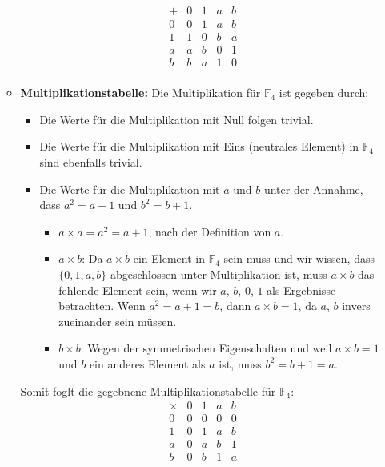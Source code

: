 \documentclass[a4paper]{scrartcl}
\begin{document}
\begin{enumerate}[label=\alph*)]
\begin{itemize}
\[\begin{array}{c|cccc}
    + & 0 & 1 & a & b \\
    \hline
    0 & 0 & 1 & a & b \\
    1 & 1 & 0 & b & a \\
    a & a & b & 0 & 1 \\
    b & b & a & 1 & 0 \\
    \end{array}
    \]
  \item \textbf{Multiplikationstabelle:} Die Multiplikation für $\mathbb{F}_4$ ist gegeben durch:
  \begin{itemize}
    \item Die Werte für die Multiplikation mit Null folgen trivial. 
    \item Die Werte für die Multiplikation mit Eins (neutrales Element) in \( \mathbb{F}_4 \) sind ebenfalls trivial.
    \item Die Werte für die Multiplikation mit \( a \) und \( b \) unter der Annahme, dass \(a^2 = a + 1\) und \(b^2 = b + 1\).
    \begin{itemize}
        \item $a \times a = a^2 = a + 1$, nach der Definition von $a$.
        \item $a \times b$: Da $a \times b$ ein Element in $\mathbb{F}_4$ sein muss und wir wissen, dass $\{0,1,a,b\}$ abgeschlossen unter Multiplikation ist, muss $a \times b$ das fehlende Element sein, wenn wir $a$, $b$, $0$, $1$ als Ergebnisse betrachten. Wenn $a^2 = a + 1 = b$, dann $a \times b = 1$, da $a$, $b$ invers zueinander sein müssen.
        \item $b \times b$: Wegen der symmetrischen Eigenschaften und weil $a \times b = 1$ und $b$ ein anderes Element als $a$ ist, muss $b^2 = b + 1 = a$.
    \end{itemize}
    \end{itemize}
    Somit foglt die gegebnene Multiplikationstabelle für \( \mathbb{F}_4 \):
  \[
  \begin{array}{c|cccc}
  \times & 0 & 1 & a & b \\
  \hline
  0 & 0 & 0 & 0 & 0 \\
  1 & 0 & 1 & a & b \\
  a & 0 & a & b & 1 \\
  b & 0 & b & 1 & a \\
  \end{array}
  \]
  \end{itemize}
\end{enumerate}

\newpage
\end{document}
